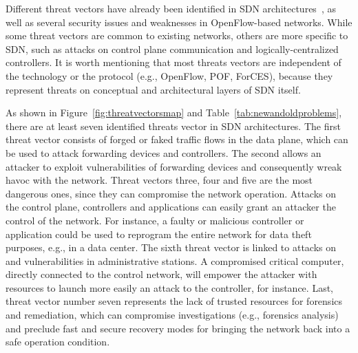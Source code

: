 Different threat vectors have already been identified in SDN architectures~\cite{kreutz2013}, as well 
as several security issues and weaknesses in OpenFlow-based networks.
While some threat vectors are common to existing networks, others are more specific to SDN, such as attacks on 
control plane communication and logically-centralized controllers. It is worth mentioning that most threats vectors 
are independent of the technology or the protocol (e.g., OpenFlow, POF, ForCES), because they represent threats on 
conceptual and architectural layers of SDN itself.

%


As shown in Figure~\ref{fig:threatvectorsmap} and Table~\ref{tab:newandoldproblems}, there are at least seven 
identified threats vector in SDN architectures. The first threat vector consists of forged or faked traffic flows 
in the data plane, which can be used to attack forwarding devices and controllers. The second allows 
an attacker to exploit vulnerabilities of forwarding devices and consequently wreak havoc with the network. Threat 
vectors three, four and five are the most dangerous ones, since they can compromise the network operation. Attacks 
on the control plane, controllers and applications can easily grant an attacker the control of the network. For 
instance, a faulty or malicious controller or application could be used to reprogram the entire network for data 
theft purposes, e.g., in a data center. The sixth threat vector is linked to attacks on and vulnerabilities in 
administrative stations. A compromised critical computer, directly connected to the control network, will empower 
the attacker with resources to launch more easily an attack to the controller, for instance. Last, threat vector 
number seven represents the lack of trusted resources for forensics and remediation, which can compromise 
investigations (e.g., forensics analysis) and preclude fast and secure recovery modes for bringing the network 
back into a safe operation condition.

